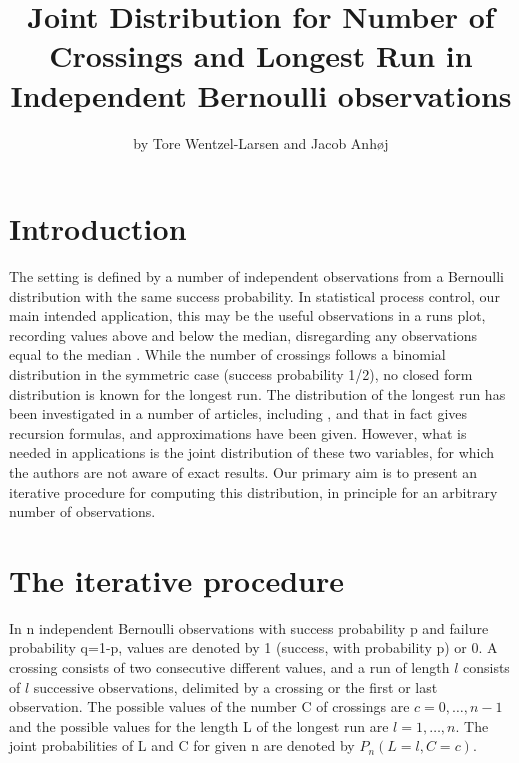 \title{Joint Distribution for Number of Crossings and Longest Run in Independent Bernoulli observations}
\author{by Tore Wentzel-Larsen and Jacob Anh{\o}j}

\maketitle


\section{Introduction}

The setting is defined by a number of independent observations from a Bernoulli distribution with the same success probability. In statistical process control, our main intended application, this may be the useful observations in a runs plot, recording values above and below the median, disregarding any observations equal to the median \citep{Anhoej:2015}. While the number of crossings follows a binomial distribution in the symmetric case (success probability 1/2), no closed form distribution is known for the longest run. The distribution of the longest run has been investigated in a number of articles, including \citet{Schilling:2012}, and \citet{Fazekas:2010} that in fact gives recursion formulas, and approximations have been given. However, what is needed in applications is the joint distribution of these two variables, for which the authors are not aware of exact results. Our primary aim is to present an iterative procedure for computing this distribution, in principle for an arbitrary number of observations.

\section{The iterative procedure}

In n independent Bernoulli observations with success probability p and failure probability q=1-p, values are denoted by 1 (success, with probability p) or 0. A crossing consists of two consecutive different values, and a run of length $l$ consists of $l$ successive observations, delimited by a crossing or the first or last observation. The possible values of the number C of crossings are $c=0, \ldots ,n-1$ and the possible values for the length L of the longest run are $l=1, \ldots ,n$. The joint probabilities of L and C for given n are denoted by $P_n (L=l,C=c)$.

